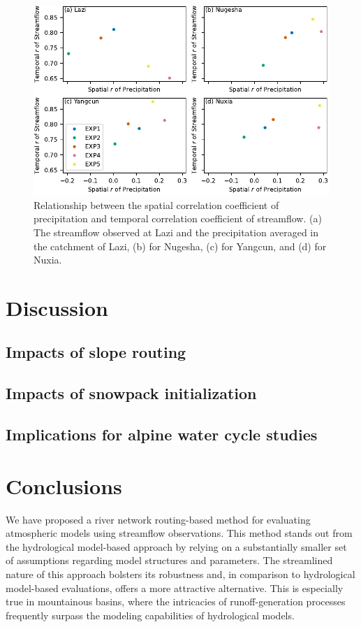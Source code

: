 \documentclass[draft]{agujournal2019}
\begin{document}
\begin{figure}[h!]
  \centering
  \noindent\includegraphics[width=140mm]{q_cc_p.pdf}
  \caption{Relationship between the spatial correlation coefficient of precipitation and temporal correlation coefficient of streamflow. (a) The streamflow observed at Lazi and the precipitation averaged in the catchment of Lazi, (b) for Nugesha, (c) for Yangcun, and (d) for Nuxia. \label{fig:q_cc_p}}
\end{figure}

\section{Discussion}
\label{sec:discussion}

\subsection{Impacts of slope routing}

\subsection{Impacts of snowpack initialization}

\subsection{Implications for alpine water cycle studies}

\section{Conclusions}
\label{sec:conclusions}

We have proposed a river network routing-based method for evaluating atmospheric models using streamflow observations. This method stands out from the hydrological model-based approach by relying on a substantially smaller set of assumptions regarding model structures and parameters. The streamlined nature of this approach bolsters its robustness and, in comparison to hydrological model-based evaluations, offers a more attractive alternative. This is especially true in mountainous basins, where the intricacies of runoff-generation processes frequently surpass the modeling capabilities of hydrological models.
\end{document}
